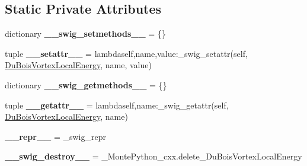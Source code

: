 \subsection*{Static Private Attributes}
\begin{DoxyCompactItemize}
\item 
\hypertarget{classMontePython__cxx_1_1DuBoisVortexLocalEnergy_a8098e80f915c4e629711bbd631f160f9}{}dictionary {\bfseries \+\_\+\+\_\+swig\+\_\+setmethods\+\_\+\+\_\+} = \{\}\label{classMontePython__cxx_1_1DuBoisVortexLocalEnergy_a8098e80f915c4e629711bbd631f160f9}

\item 
\hypertarget{classMontePython__cxx_1_1DuBoisVortexLocalEnergy_a837100dff9210e6793f46358a1d11242}{}tuple {\bfseries \+\_\+\+\_\+setattr\+\_\+\+\_\+} = lambdaself,name,value\+:\+\_\+swig\+\_\+setattr(self, \hyperlink{classMontePython__cxx_1_1DuBoisVortexLocalEnergy}{Du\+Bois\+Vortex\+Local\+Energy}, name, value)\label{classMontePython__cxx_1_1DuBoisVortexLocalEnergy_a837100dff9210e6793f46358a1d11242}

\item 
\hypertarget{classMontePython__cxx_1_1DuBoisVortexLocalEnergy_a510c0e9c23e19aacb0bf15ed79e9cbbf}{}dictionary {\bfseries \+\_\+\+\_\+swig\+\_\+getmethods\+\_\+\+\_\+} = \{\}\label{classMontePython__cxx_1_1DuBoisVortexLocalEnergy_a510c0e9c23e19aacb0bf15ed79e9cbbf}

\item 
\hypertarget{classMontePython__cxx_1_1DuBoisVortexLocalEnergy_a71f3c04894c1bb0c4f4c47be7fe19461}{}tuple {\bfseries \+\_\+\+\_\+getattr\+\_\+\+\_\+} = lambdaself,name\+:\+\_\+swig\+\_\+getattr(self, \hyperlink{classMontePython__cxx_1_1DuBoisVortexLocalEnergy}{Du\+Bois\+Vortex\+Local\+Energy}, name)\label{classMontePython__cxx_1_1DuBoisVortexLocalEnergy_a71f3c04894c1bb0c4f4c47be7fe19461}

\item 
\hypertarget{classMontePython__cxx_1_1DuBoisVortexLocalEnergy_a266322fc36cca6e54d9f7e53e3ef0a70}{}{\bfseries \+\_\+\+\_\+repr\+\_\+\+\_\+} = \+\_\+swig\+\_\+repr\label{classMontePython__cxx_1_1DuBoisVortexLocalEnergy_a266322fc36cca6e54d9f7e53e3ef0a70}

\item 
\hypertarget{classMontePython__cxx_1_1DuBoisVortexLocalEnergy_a5be62a2d2affb989d498d8bd9c91fa88}{}{\bfseries \+\_\+\+\_\+swig\+\_\+destroy\+\_\+\+\_\+} = \+\_\+\+Monte\+Python\+\_\+cxx.\+delete\+\_\+\+Du\+Bois\+Vortex\+Local\+Energy\label{classMontePython__cxx_1_1DuBoisVortexLocalEnergy_a5be62a2d2affb989d498d8bd9c91fa88}

\end{DoxyCompactItemize}


